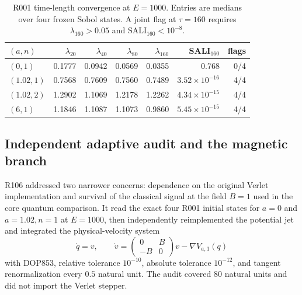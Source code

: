\begin{table}[t]
 \centering
 \caption{R001 time-length convergence at \(E=1000\).  Entries are medians
 over four frozen Sobol states.  A joint flag at \(\tau=160\) requires
 \(\lambda_{160}>0.05\) and \(\mathrm{SALI}_{160}<10^{-8}\).}
 \label{tab:classical-time-convergence}
 \small
 \begin{tabular}{@{}lrrrrrr@{}}
 \toprule
 \((a,n)\) & \(\lambda_{20}\) & \(\lambda_{40}\) &
 \(\lambda_{80}\) & \(\lambda_{160}\) & SALI\(_{160}\) & flags \\
 \midrule
 \((0,1)\)    & 0.1777 & 0.0942 & 0.0569 & 0.0355 & 0.768 & 0/4 \\
 \((1.02,1)\) & 0.7568 & 0.7609 & 0.7560 & 0.7489 & \(3.52\times10^{-16}\) & 4/4 \\
 \((1.02,2)\) & 1.2902 & 1.1069 & 1.2178 & 1.2262 & \(4.34\times10^{-15}\) & 4/4 \\
 \((6,1)\)    & 1.1846 & 1.1087 & 1.1073 & 0.9860 & \(5.45\times10^{-15}\) & 4/4 \\
 \bottomrule
 \end{tabular}
\end{table}

\subsection{Independent adaptive audit and the magnetic branch}

R106 addressed two narrower concerns: dependence on the original Verlet
implementation and survival of the classical signal at the field \(B=1\)
used in the core quantum comparison.  It read the exact four R001 initial
states for \(a=0\) and \(a=1.02,n=1\) at \(E=1000\), then independently
reimplemented the potential jet and integrated the physical-velocity system
\begin{equation}
 \dot q=v,
 \qquad
 \dot v=
 \begin{pmatrix}0&B\\-B&0\end{pmatrix}v-\nabla V_{a,1}(q)
 \label{eq:magnetic-velocity-flow}
\end{equation}
with DOP853, relative tolerance \(10^{-10}\), absolute tolerance
\(10^{-12}\), and tangent renormalization every \(0.5\) natural unit.  The
audit covered 80 natural units and did not import the Verlet stepper.

